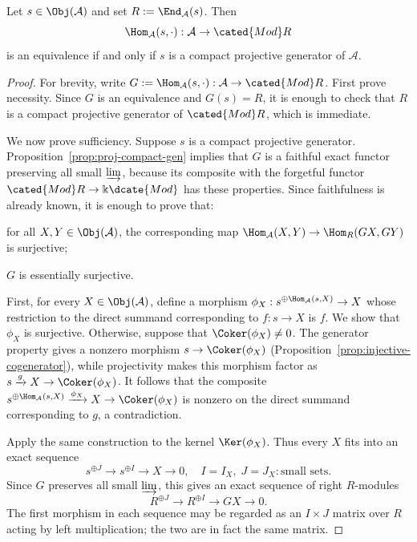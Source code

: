 \begin{theorem}[P.\ Gabriel]\label{prop:identify-ModR}
	Let $s\in\Obj(\mathcal{A})$ and set
	$R:=\End_{\mathcal{A}}(s)$. Then
	\[ \Hom_{\mathcal{A}}(s, \cdot): \mathcal{A} \to \cated{Mod}R \]
	is an equivalence if and only if $s$ is a compact projective generator of
	$\mathcal{A}$.
\end{theorem}
\begin{proof}
	For brevity, write
	$G:=\Hom_{\mathcal{A}}(s,\mathord\cdot):\mathcal{A}\to\cated{Mod}R$.
	First prove necessity. Since $G$ is an equivalence and $G(s)=R$, it is
	enough to check that $R$ is a compact projective generator of
	$\cated{Mod}R$, which is immediate.

	We now prove sufficiency. Suppose $s$ is a compact projective generator.
	Proposition~\ref{prop:proj-compact-gen} implies that $G$ is a faithful
	exact functor preserving all small $\varinjlim$, because its composite with
	the forgetful functor $\cated{Mod}R\to\Bbbk\dcate{Mod}$ has these
	properties. Since faithfulness is already known, it is enough to prove
	that:
	\begin{compactitem}
		\item for all $X,Y\in\Obj(\mathcal{A})$, the corresponding map
		$\Hom_{\mathcal{A}}(X,Y)\to\Hom_R(GX,GY)$ is surjective;
		\item $G$ is essentially surjective.
	\end{compactitem}

	First, for every $X\in\Obj(\mathcal{A})$, define a morphism
	$\phi_X:s^{\oplus\Hom_{\mathcal{A}}(s,X)}\to X$ whose restriction to the
	direct summand corresponding to $f:s\to X$ is $f$. We show that $\phi_X$
	is surjective. Otherwise, suppose that $\Coker(\phi_X)\neq0$. The generator
	property gives a nonzero morphism $s\to\Coker(\phi_X)$
	(Proposition~\ref{prop:injective-cogenerator}), while projectivity makes
	this morphism factor as $s\xrightarrow{g}X\to\Coker(\phi_X)$. It follows
	that the composite
	$ s^{\oplus\Hom_{\mathcal{A}}(s,X)}\xrightarrow{\phi_X}X
	\to\Coker(\phi_X)$ is nonzero on the direct summand corresponding to $g$,
	a contradiction.

	Apply the same construction to the kernel $\Ker(\phi_X)$. Thus every $X$
	fits into an exact sequence
	\[ s^{\oplus J} \to s^{\oplus I} \to X \to 0, \quad I = I_X, \; J = J_X: \text{small sets}. \]
	Since $G$ preserves all small $\varinjlim$, this gives an exact sequence of
	right $R$-modules
	\[ R^{\oplus J} \to R^{\oplus I} \to GX \to 0. \]
	The first morphism in each sequence may be regarded as an $I\times J$
	matrix over $R$ acting by left multiplication; the two are in fact the
	same matrix.


\end{proof}
